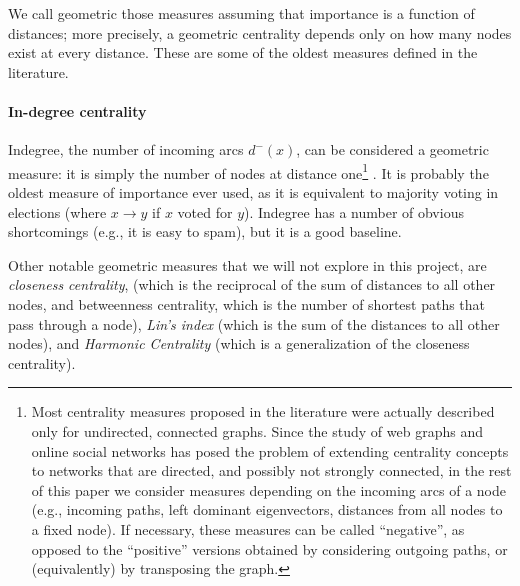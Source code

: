 \documentclass[12pt]{article}
\newcommand{\s}{\vspace*{0.4cm}}
\newcommand{\nd}{\noindent}
\begin{document}
We call geometric those measures assuming that importance is a function of distances; more precisely, a geometric centrality depends only on how many nodes exist at every distance. These are some of the oldest measures defined in the literature.

\paragraph*{In-degree centrality} Indegree, the number of incoming arcs $d^-(x)$, can be considered a geometric measure: it is simply the number of nodes at distance one\footnote{Most centrality measures proposed in the literature were actually described only for undirected, connected graphs. Since the study of web graphs and online social networks has posed the problem of extending centrality concepts to networks that are directed, and possibly not strongly connected, in the rest of this paper we consider measures depending on the incoming arcs of a node (e.g., incoming paths, left dominant eigenvectors, distances from all nodes to a fixed node). If necessary, these measures can be called “negative”, as opposed to the “positive” versions obtained by considering outgoing paths, or (equivalently) by transposing the graph.} . It is probably the oldest measure of importance ever used, as it is equivalent to majority voting in elections (where $x \to y$ if $x$ voted for $y$). Indegree has a number of obvious shortcomings (e.g., it is easy to spam), but it is a good baseline. \s

\nd Other notable geometric measures that we will not explore in this project, are \emph{closeness centrality}, (which is the reciprocal of the sum of distances to all other nodes, and betweenness centrality, which is the number of shortest paths that pass through a node), \emph{Lin's index} (which is the sum of the distances to all other nodes), and \emph{Harmonic Centrality} (which is a generalization of the closeness centrality). \s


\clearpage


\nocite{*}
\end{document}
